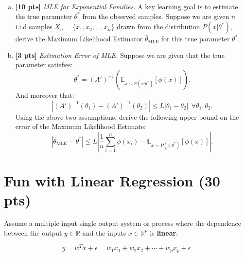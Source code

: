 \documentclass{article}
\newenvironment{soln}{
	\leavevmode\color{blue}\ignorespaces
}{}
\begin{document}
\begin{enumerate}[(a)]
\item \textbf{[10 pts]} \emph{MLE for Exponential Families.}
A key learning goal is to estimate the true parameter $\theta^*$ from the observed samples. Suppose we are given $n$ i.i.d samples $X_n = \{ x_1,x_2,\ldots,x_n\}$ drawn from the distribution $P(x|\theta^*)$, derive the Maximum Likelihood Estimator $\widehat{\theta}_{\text{MLE}}$ for this true parameter $\theta^*$.

\begin{soln}

\end{soln}

\item \textbf{[3 pts]} \emph{Estimation Error of MLE.} Suppose we are given that the true parameter satisfies:
\[ \theta^* = (A')^{-1}\left(\mathbb{E}_{x \sim P(x|\theta^*)}[\phi(x)]\right).\]
And moreover that:
 \[ | (A')^{-1} (\theta_1) - (A')^{-1}(\theta_2) | \leq  L | \theta_1 - \theta_2 |  \ \ \forall \theta_1,\theta_2 . \]
Using the above two assumptions, derive the following upper bound on the error of the Maximum Likelihood Estimate:
\[ | \widehat{\theta}_{\text{MLE}} - \theta^* |  \leq L \left| \frac{1}{n} \sum \limits_{i=1}^n \phi(x_i) - \mathbb{E}_{x \sim P(x|\theta^*)} [\phi(x)] \right|. \]

\begin{soln}

\end{soln}

\end{enumerate}


\newpage

\section{Fun with Linear Regression (30 pts)}
Assume a multiple input single output system or process where the dependence between the output $y \in \mathbb{R}$ and the inputs $x \in \mathbb{R}^p$ is \textbf{linear}:

\begin{equation}
  y = w^Tx + \epsilon = w_1x_1 + w_2x_2 + \cdots + w_px_p + \epsilon
\end{equation}
\end{document}
